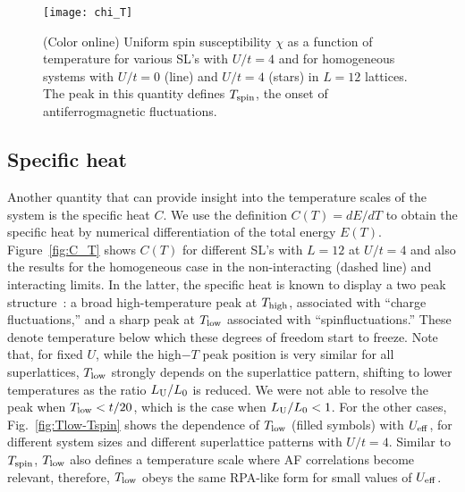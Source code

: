 \documentclass[aps,pra,reprint,twocolumn,showpacs,longbibliography,superscriptaddress]{revtex4-1}
\begin{document}
\begin{figure}[!tb] %
  \texttt{[image: chi\_T]}
 \caption{(Color online) Uniform spin susceptibility $\chi$ as a function of temperature for various SL's with $U/t=4$ and for homogeneous systems with $U/t=0$ (line) and $U/t=4$ (stars) in $L=12$ lattices. The peak in this quantity defines $T_{\rm spin}$, the onset of antiferrogmagnetic fluctuations.}
 \label{fig:chi_T}
\end{figure}




\subsection{Specific heat}
Another quantity that can provide insight into the temperature scales of the system is the specific heat $C$. We use the definition $C(T)=dE/dT$ to obtain the specific heat  by numerical differentiation of the total energy $E(T)$. Figure~\ref{fig:C_T} shows $C(T)$ for different SL's with $L=12$ at $U/t=4$ and also the results for the homogeneous case in the non-interacting (dashed line) and interacting limits. In the latter, the specific heat is known to display a two peak structure~\cite{Paiva01,Duffy97}: a broad high-temperature peak at $T_{\rm high}$, associated  with ``charge fluctuations,''  and a sharp peak at $T_{\rm low}$  associated with ``spinfluctuations.'' These denote temperature below which these degrees of freedom start to freeze.  Note that, for fixed $U$,  while the high$-T$ peak position is very similar for all superlattices, $T_{\rm low}$ strongly depends on the superlattice pattern, shifting to lower temperatures as the ratio $L_{\rm U}/L_0$ is reduced. We were not able to resolve the peak when $T_{\rm low} < t/20$, which is the case when $L_{\rm U}/L_0<1$. For the other cases, Fig.~\ref{fig:Tlow-Tspin} shows the dependence of $T_{\rm low}$ (filled symbols) with $U_{\rm eff}$, for different system sizes and different superlattice patterns with $U/t=4$.  Similar to $T_{\rm spin}$,  $T_{\rm low}$ also defines a temperature scale where AF correlations become relevant, therefore, $T_{\rm low}$ obeys the same  RPA-like form for small values of $U_{\rm eff}$.
\end{document}

